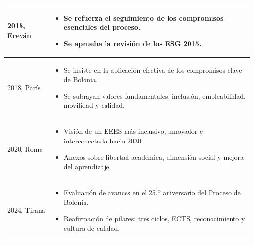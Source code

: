 \documentclass[
  letterpaper,
  DIV=11,
  numbers=noendperiod]{scrartcl}
\begin{document}
\begin{longtable*}{p{3cm} p{11.5cm}}
2015, Ereván &
\begin{itemize}
\item Se refuerza el seguimiento de los compromisos esenciales del proceso.
\item Se aprueba la revisión de los ESG 2015.
\end{itemize}
\\ \hline

2018, París &
\begin{itemize}
\item Se insiste en la aplicación efectiva de los compromisos clave de Bolonia.
\item Se subrayan valores fundamentales, inclusión, empleabilidad, movilidad y calidad.
\end{itemize}
\\ \hline

2020, Roma &
\begin{itemize}
\item Visión de un EEES más inclusivo, innovador e interconectado hacia 2030.
\item Anexos sobre libertad académica, dimensión social y mejora del aprendizaje.
\end{itemize}
\\ \hline

2024, Tirana &
\begin{itemize}
\item Evaluación de avances en el 25.º aniversario del Proceso de Bolonia.
\item Reafirmación de pilares: tres ciclos, ECTS, reconocimiento y cultura de calidad.
\end{itemize}
\\ \hline

\end{longtable*}
\end{document}
